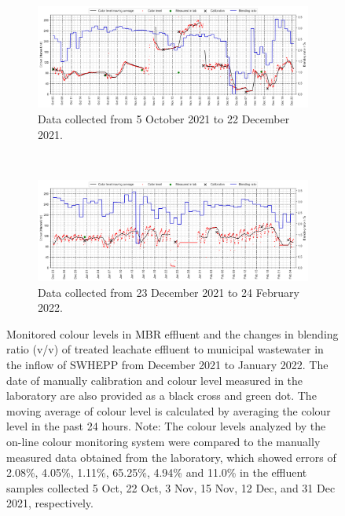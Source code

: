 \begin{figure}[!ht]
    \centering
    \begin{subfigure}[t]{1.0\textwidth}
      \includegraphics[width=\linewidth]{imgs/leachate-effluent-blend-ratio-color-plot/first-80d.png}
      \caption{Data collected from 5 October 2021 to 22 December 2021.} \label{fig:data-oct}
    \end{subfigure}\\
    \vspace{2em}%
    \begin{subfigure}[t]{1.0\textwidth}
      \includegraphics[width=\linewidth]{imgs/leachate-effluent-blend-ratio-color-plot/second-80d.png}
      \caption{Data collected from 23 December 2021 to 24 February 2022.} \label{fig:data-nov}
    \end{subfigure}%
  \caption{Monitored colour levels in MBR effluent and the changes in blending ratio (v/v) of treated leachate effluent to municipal wastewater in the inflow of SWHEPP from December 2021 to January 2022. The date of manually calibration and colour level measured in the laboratory are also provided as a black cross and green dot. The moving average of colour level is calculated by averaging the colour level in the past 24 hours. Note: The colour levels analyzed by the on-line colour monitoring system were compared to the manually measured data obtained from the laboratory, which showed errors of 2.08\%, 4.05\%, 1.11\%, 65.25\%, 4.94\% and 11.0\% in the effluent samples collected 5 Oct, 22 Oct, 3 Nov, 15 Nov, 12 Dec, and 31 Dec 2021, respectively.} \label{fig:nh3-data}
\end{figure}

